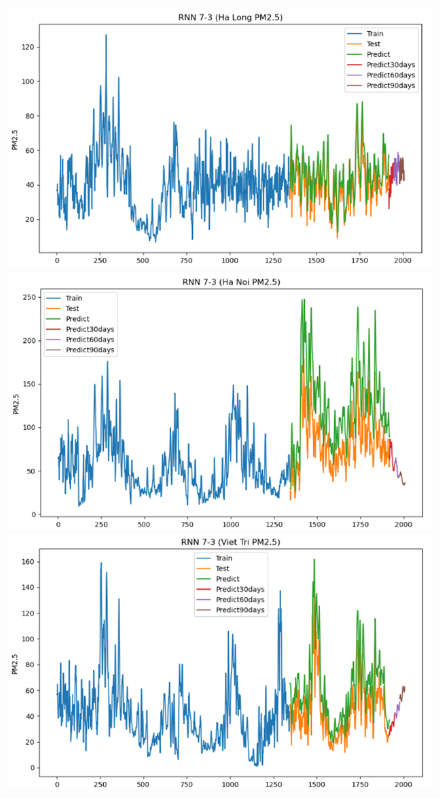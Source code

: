 
\begin{figure}[H]

    \centering
    \begin{minipage}{0.15\textwidth}
    \centering
    \end{minipage}
    \hfill

    \begin{minipage}{0.15\textwidth}
        \centering
        \includegraphics[width=1\textwidth]{img/final/RNN/90D/RNN_7_3_HL.png}
        \end{minipage}
        \hfill
        \begin{minipage}{0.15\textwidth}
        \centering
        \includegraphics[width=1\textwidth]{img/final/RNN/90D/RNN_7_3_HN.png}
        \end{minipage}
        \hfill
        \begin{minipage}{0.15\textwidth}
        \centering
        \includegraphics[width=1\textwidth]{img/final/RNN/90D/RNN_7_3_VT.png}

\end{minipage}
\end{figure}
